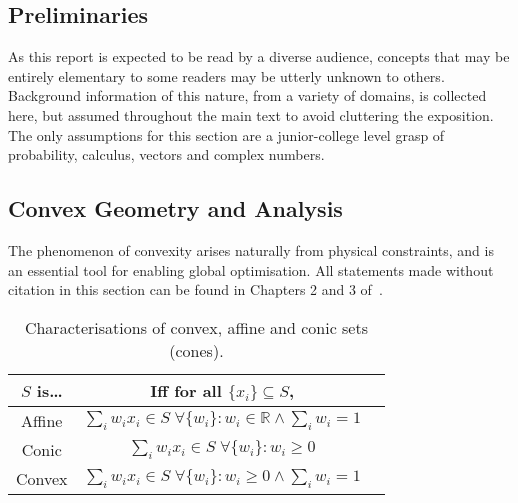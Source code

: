 \documentclass[10pt, a4paper]{article}
\numberwithin{equation}{section} %
\theoremstyle{definition}
\theoremstyle{plain}
\newenvironment{Tabular}[1] %
{\def\arraystretch{1.75}\begin{tabular}{#1}}
{\end{tabular}}
\newcommand{\?}{\mathrel{?}} %
\newcommand{\R}{\mathbb{R}} %
\begin{document}
                        \begin{appendices}

                          \section{Preliminaries}\label{sec:prelim}

                          As this report is expected to be read by a diverse audience, concepts that may be entirely elementary to some readers may be utterly unknown to others. Background information of this nature, from a variety of domains, is collected here, but assumed throughout the main text to avoid cluttering the exposition. The only assumptions for this section are a junior-college level grasp of probability, calculus, vectors and complex numbers.

                          \subsection{Convex Geometry and Analysis}\label{sec:prelim_cvxgeom}

                          The phenomenon of convexity arises naturally from physical constraints, and is an essential tool for enabling global optimisation. All statements made without citation in this section can be found in Chapters 2 and 3 of~\cite{BoydVand}.

                          \begin{table}[H]
                            \centering
                            \begin{Tabular}{ccl} 
                              \toprule
                              \(S\) is\ldots & Iff for all \(\{x_i\} \subseteq S\), \\
                              \midrule
                              Affine & \(\sum_i w_i x_i \in S\;\forall \{w_i\} : w_i \in \R \land \sum_i w_i = 1 \)  \\
                              Conic & \(\sum_i w_i x_i \in S\;\forall \{w_i\} : w_i \geq 0\)  \\
                              Convex & \(\sum_i w_i x_i \in S\;\forall \{w_i\} : w_i \geq 0 \land \sum_i w_i = 1 \)  \\
                              \bottomrule
                            \end{Tabular}
                            \caption{Characterisations of convex, affine and conic sets (cones).}\label{tab:sets}
                          \end{table}


\end{appendices}
\end{document}
